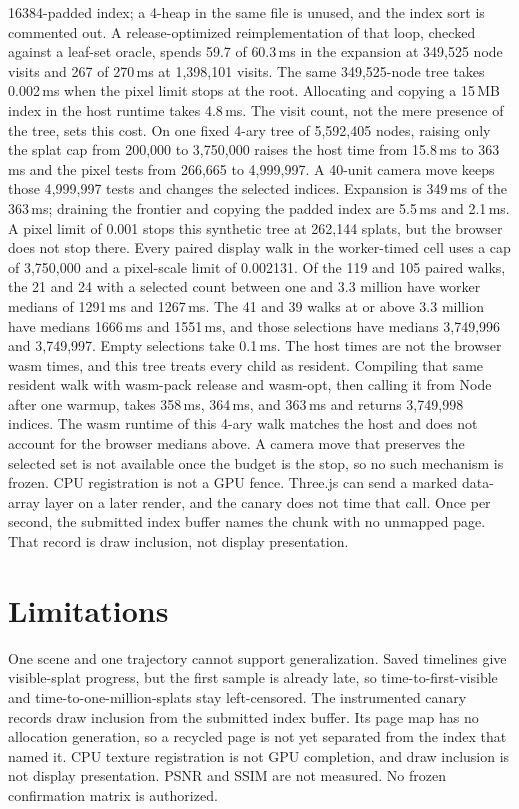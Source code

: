 \documentclass[sigconf,anonymous,review]{acmart}
\begin{document}
16384-padded index; a 4-heap in the same file is unused, and the index sort is commented out. A release-optimized reimplementation of that loop, checked against a leaf-set oracle, spends 59.7 of 60.3\,ms in the expansion at 349{,}525 node visits and 267 of 270\,ms at 1{,}398{,}101 visits. The same 349{,}525-node tree takes 0.002\,ms when the pixel limit stops at the root. Allocating and copying a 15\,MB index in the host runtime takes 4.8\,ms. The visit count, not the mere presence of the tree, sets this cost. On one fixed 4-ary tree of 5{,}592{,}405 nodes, raising only the splat cap from 200{,}000 to 3{,}750{,}000 raises the host time from 15.8\,ms to 363\,ms and the pixel tests from 266{,}665 to 4{,}999{,}997. A 40-unit camera move keeps those 4{,}999{,}997 tests and changes the selected indices. Expansion is 349\,ms of the 363\,ms; draining the frontier and copying the padded index are 5.5\,ms and 2.1\,ms. A pixel limit of 0.001 stops this synthetic tree at 262{,}144 splats, but the browser does not stop there. Every paired display walk in the worker-timed cell uses a cap of 3{,}750{,}000 and a pixel-scale limit of 0.002131. Of the 119 and 105 paired walks, the 21 and 24 with a selected count between one and 3.3 million have worker medians of 1291\,ms and 1267\,ms. The 41 and 39 walks at or above 3.3 million have medians 1666\,ms and 1551\,ms, and those selections have medians 3{,}749{,}996 and 3{,}749{,}997. Empty selections take 0.1\,ms. The host times are not the browser wasm times, and this tree treats every child as resident. Compiling that same resident walk with wasm-pack release and wasm-opt, then calling it from Node after one warmup, takes 358\,ms, 364\,ms, and 363\,ms and returns 3{,}749{,}998 indices. The wasm runtime of this 4-ary walk matches the host and does not account for the browser medians above. A camera move that preserves the selected set is not available once the budget is the stop, so no such mechanism is frozen. CPU registration is not a GPU fence. Three.js can send a marked data-array layer on a later render, and the canary does not time that call. Once per second, the submitted index buffer names the chunk with no unmapped page. That record is draw inclusion, not display presentation.
\section{Limitations}
One scene and one trajectory cannot support generalization. Saved timelines give visible-splat progress, but the first sample is already late, so time-to-first-visible and time-to-one-million-splats stay left-censored. The instrumented canary records draw inclusion from the submitted index buffer. Its page map has no allocation generation, so a recycled page is not yet separated from the index that named it. CPU texture registration is not GPU completion, and draw inclusion is not display presentation. PSNR and SSIM are not measured. No frozen confirmation matrix is authorized.
\end{document}
